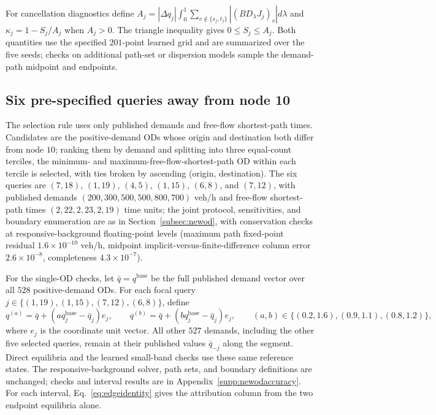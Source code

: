 For cancellation diagnostics define
$A_j=|\Delta q_j|\int_0^1\sum_{v\notin\{s_j,t_j\}}|(BD_\lambda J_j)_v|d\lambda$
and $\kappa_j=1-S_j/A_j$ when $A_j>0$. The triangle inequality gives
$0\le S_j\le A_j$. Both quantities use the specified $201$-point learned
grid and are summarized over the five seeds; checks on additional
path-set or dispersion models sample the demand-path midpoint and
endpoints.

\subsection{Six pre-specified queries away from node 10}\label{supp:newod}
The selection rule uses only published demands and free-flow
shortest-path times. Candidates are the positive-demand ODs whose origin
and destination both differ from node $10$; ranking them by demand and
splitting into three equal-count terciles, the minimum- and
maximum-free-flow-shortest-path OD within each tercile is selected, with
ties broken by ascending (origin, destination). The six queries are
$(7,18)$, $(1,19)$, $(4,5)$, $(1,15)$, $(6,8)$, and $(7,12)$, with
published demands $(200,300,500,500,800,700)$ veh/h and free-flow
shortest-path times $(2,22,2,23,2,19)$ time units; the joint
protocol, sensitivities, and boundary enumeration are as in
Section~\ref{subsec:newod}, with conservation checks at responsive-background
floating-point levels (maximum path fixed-point residual
$1.6\times10^{-10}$ veh/h, midpoint implicit-versus-finite-difference
column error $2.6\times10^{-8}$, completeness $4.3\times10^{-7}$).

For the single-OD checks, let $\bar q=q^{\mathrm{base}}$ be the full
published demand vector over all $528$ positive-demand ODs. For each
focal query $j\in\{(1,19),(1,15),(7,12),(6,8)\}$, define
\begin{equation}
q^{(a)}=\bar q+(a q_j^{\mathrm{base}}-\bar q_j)e_j,
\qquad
q^{(b)}=\bar q+(b q_j^{\mathrm{base}}-\bar q_j)e_j,
\qquad
(a,b)\in\{(0.2,1.6),(0.9,1.1),(0.8,1.2)\},
\label{eq:singleodstates}
\end{equation}
where $e_j$ is the coordinate unit vector. All other $527$ demands,
including the other five selected queries, remain at their published
values $\bar q_{-j}$ along the segment. Direct equilibria and the learned
small-band checks use these same reference states. The responsive-background solver,
path sets, and boundary definitions are unchanged; checks and interval
results are in Appendix~\ref{supp:newodaccuracy}. For each interval,
Eq.~\eqref{eq:edgeidentity} gives the attribution column from the two
endpoint equilibria alone.

